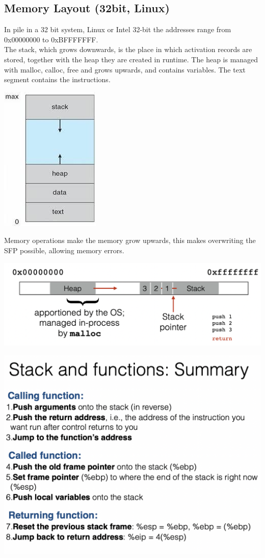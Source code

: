 \documentclass[11pt, oneside]{article}   	%
\begin{document}
\subsection*{Memory Layout (32bit, Linux)}
In pile in a 32 bit system, Linux or Intel 32-bit the addresses range from 0x00000000 to 0xBFFFFFFF.\\
The stack, which grows downwards, is the place in which activation records are stored, together with the heap they are created in runtime. The heap is managed with malloc, calloc, free and grows upwards, and contains variables. The text segment contains the instructions.
\begin{center}
\includegraphics[scale = 0.5]{heapstack}
\end{center}
Memory operations make the memory grow upwards, this makes overwriting the SFP possible, allowing memory errors.
\begin{center}
\includegraphics[scale = 0.5]{memory5}
\end{center}
\begin{center}
\includegraphics[scale = 0.4]{memory6}
\end{center}
\end{document}
